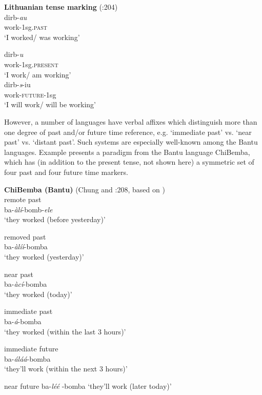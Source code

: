 \ea \label{ex:21.36}
\textbf{Lithuanian tense marking} (\citealt{ChungTimberlake1985}:204)\\
\ea  
\gll dirb-\textit{au}\\
work-1sg\textsc{.past} \\
\glt ‘I worked/ was working’

\ex
\gll dirb-\textit{u}\\
work-1sg\textsc{.present} \\
\glt ‘I work/ am working’\\

\ex
\gll dirb-\textit{s}-iu\\
work-\textsc{future-}1sg \\
\glt ‘I will work/ will be working’
\z
\z

However, a number of languages have verbal affixes which distinguish more than one degree of past and/or future time reference, e.g. ‘immediate past’ vs. ‘near past’ vs. ‘distant past’. Such systems are especially well-known among the Bantu languages. Example  presents a paradigm from the Bantu language ChiBemba, which has (in addition to the present tense, not shown here) a symmetric set of four past and four future time markers.

\ea \label{ex:21.37}
\textbf{ChiBemba (Bantu)} (Chung and \citealt{Timberlake1985}:208, based on \citealt{Givón1972})\\
\ea  remote past\\
    ba-\textit{àlí}-bomb-\textit{ele}   \\
\glt‘they worked (before yesterday)’

\ex removed past\\
     ba-\textit{àlíí}-bomba   \\
\glt‘they worked (yesterday)’

\ex near past \\
    ba-\textit{àcí}-bomba   \\
\glt‘they worked (today)’

\ex immediate past \\
   ba-\textit{á}-bomba   \\
\glt‘they worked (within the last 3 hours)’

\ex immediate future   \\
 ba-\textit{áláá}-bomba \\  
\glt‘they’ll work (within the next 3 hours)’

\ex near future  
  ba-\textit{léé} -bomba   
\glt‘they’ll work (later today)’

